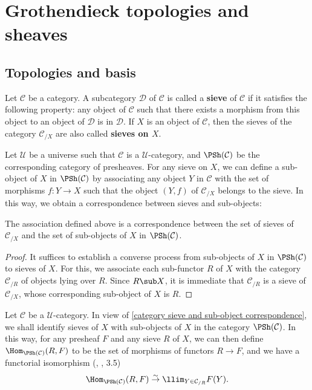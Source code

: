 \section{Grothendieck topologies and sheaves}
\subsection{Topologies and basis}
Let $\mathcal{C}$ be a category. A subcategory $\mathcal{D}$ of $\mathcal{C}$ is called a \textbf{sieve} of $\mathcal{C}$ if it satisfies the following property: any object of $\mathcal{C}$ such that there exists a morphism from this object to an object of $\mathcal{D}$ is in $\mathcal{D}$. If $X$ is an object of $\mathcal{C}$, then the sieves of the category $\mathcal{C}_{/X}$ are also called \textbf{sieves on $X$}.\par
Let $\mathscr{U}$ be a universe such that $\mathcal{C}$ is a $\mathscr{U}$-category, and $\PSh(\mathcal{C})$ be the corresponding category of presheaves. For any sieve on $X$, we can define a sub-object of $X$ in $\PSh(\mathcal{C})$ by associating any object $Y$ in $\mathcal{C}$ with the set of morphisms $f:Y\to X$ such that the object $(Y,f)$ of $\mathcal{C}_{/X}$ belongs to the sieve. In this way, we obtain a correspondence between sieves and sub-objects:
\begin{proposition}\label{category sieve and subobject correspondence}
The association defined above is a correspondence between the set of sieves of $\mathcal{C}_{/X}$ and the set of sub-objects of $X$ in $\PSh(\mathcal{C})$.
\end{proposition}
\begin{proof}
It suffices to establish a converse process from sub-objects of $X$ in $\PSh(\mathcal{C})$ to sieves of $X$. For this, we associate each sub-functor $R$ of $X$ with the category $\mathcal{C}_{/R}$ of objects lying over $R$. Since $R\sub X$, it is immediate that $\mathcal{C}_{/R}$ is a sieve of $\mathcal{C}_{/X}$, whose corresponding sub-object of $X$ is $R$.
\end{proof}
Let $\mathcal{C}$ be a $\mathscr{U}$-category. In view of \cref{category sieve and sub-object correspondence}, we shall identify sieves of $X$ with sub-objects of $X$ in the category $\PSh(\mathcal{C})$. In this way, for any presheaf $F$ and any sieve $R$ of $X$, we can then define $\Hom_{\PSh(\mathcal{C})}(R,F)$ to be the set of morphisms of functors $R\to F$, and we have a functorial isomorphism (\cite{SGA4-1}, , 3.5)
\begin{equation}\label{category Hom of functors char by limit}
\Hom_{\PSh(\mathcal{C})}(R,F) \stackrel{\sim}{\to } \llim_{Y\in\mathcal{C}_{/R}}F(Y).
\end{equation}
